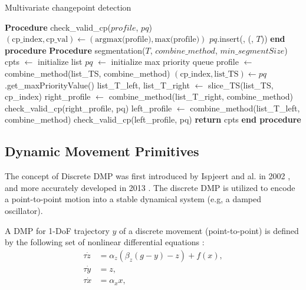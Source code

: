 \documentclass[conference]{IEEEtran}
\begin{document}
\begin{algorithm}
 \caption{Multivariate changepoint detection}
\begin{algorithmic}[1]
    \STATE \textbf{Procedure} check\_valid\_cp($profile$, $pq$)
    \STATE $(\text{cp\_index}, \text{cp\_val}) \leftarrow (\text{argmax(profile)}, \text{max(profile)})$
        \STATE $pq$.insert(, (, $T$))
    \ENDIF
    \STATE \textbf{end procedure}
    \STATE
    \STATE \textbf{Procedure} segmentation($T$, $combine\_method$, $min\_segmentSize$)
    \STATE cpts $\leftarrow$ initialize list
    \STATE $pq$ $\leftarrow$ initialize max priority queue
    \STATE profile $\leftarrow$ combine\_method(list\_TS, combine\_method)
        \STATE $(\text{cp\_index}, \text{list\_TS}) \leftarrow pq$.get\_maxPriorityValue()
        \STATE list\_T\_left, list\_T\_right $\leftarrow$ slice\_TS(list\_TS, cp\_index)
            \STATE right\_profile $\leftarrow$ combine\_method(list\_T\_right, combine\_method)
            \STATE check\_valid\_cp(right\_profile, pq)
        \ENDIF
            \STATE left\_profile $\leftarrow$ combine\_method(list\_T\_left, combine\_method)
            \STATE check\_valid\_cp(left\_profile, pq)
        \ENDIF
        \STATE
    \ENDWHILE
    \STATE \textbf{return} cpts
    \STATE \textbf{end procedure}
\end{algorithmic}
 \label{alg:CPD}
\end{algorithm}


\subsection{Dynamic Movement Primitives}

The concept of Discrete DMP was first introduced by Ispjeert and al. in 2002 \cite{ijspeert_movement_2002}, and more accurately developed in 2013 \cite{ijspeert_dynamical_2013}. The discrete DMP is utilized to encode a point-to-point motion into a stable dynamical system (e.g, a damped oscillator).

 A DMP for 1-DoF trajectory $y$ of a discrete movement (point-to-point) is defined by the following set of nonlinear differential equations \cite{ijspeert_movement_2002}:
\begin{align}
\tau \dot{z} &= \alpha_z \left(\beta_z(g - y) - z\right) + f(x), \label{Eq1} \\
\tau \dot{y} &= z,  \label{Eq2} \\
\tau \dot{x} &= \alpha_x x,  \label{Eq3}
\end{align}
\end{document}
